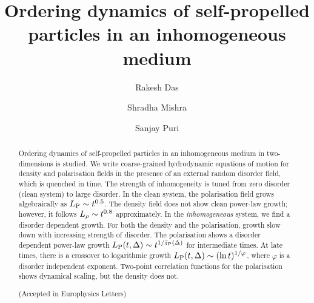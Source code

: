 \documentclass[pre,twocolumn,amssymb,showpacs,superscriptaddress,notitlepage]{revtex4-1}
\begin{document}

\title{Ordering dynamics of self-propelled particles in an inhomogeneous medium}

\author{Rakesh Das}
\author{Shradha Mishra}
\author{Sanjay Puri}


\begin{abstract}
Ordering dynamics of  self-propelled  particles in an inhomogeneous
medium in two-dimensions is studied. We write coarse-grained hydrodynamic equations of motion for 
density and  polarisation fields in the
presence of an external random disorder field, which is quenched in time. The strength of inhomogeneity is tuned 
from zero disorder (clean system) to large disorder.
In the clean system, the  polarisation 
field grows algebraically as  $L_{\rm  P} \sim t^{0.5}$. The density field 
does not show clean power-law growth; however, it  follows $L_{\rm \rho} \sim t^{0.8}$ approximately. 
In the {\it inhomogeneous} system, we find a disorder dependent growth.
For both the density and the  polarisation, growth slow down with increasing strength of disorder. 
The  polarisation shows a disorder dependent power-law growth 
$L_{\rm  P}(t,\Delta) \sim t^{1/\bar z_{\rm  P}(\Delta)}$  
for intermediate times.
At late times, there is a crossover to logarithmic growth $L_{\rm  P}(t,\Delta) \sim (\ln t)^{1/\varphi}$, where $\varphi$  
is a disorder independent exponent.  
Two-point correlation functions for the   polarisation shows dynamical scaling, but the density does not.\\ 
\begin{center}(Accepted in Europhysics Letters)\end{center}
\end{abstract}

\end{document}
